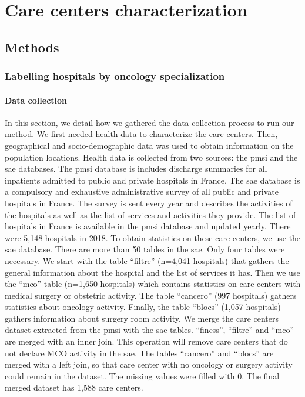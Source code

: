 \chapter{Care centers characterization}
\label{chapter:center-characterization}

\section{Methods}

\subsection{Labelling hospitals by oncology specialization}
\label{section:oncology-specialization-cluster}

\subsubsection{Data collection}

In this section, we detail how we gathered the data collection process to run
our method.  We first needed health data to characterize the care centers. Then,
geographical and socio-demographic data was used to obtain information on the
population locations. Health data is collected from two sources: the \ac{pmsi}
and the \ac{sae} databases. The \ac{pmsi} database is includes discharge
summaries for all inpatients admitted to public and private hospitals in France.
The \ac{sae} database is a compulsory and exhaustive administrative survey of
all public and private hospitals in France. The survey is sent every year and
describes the activities of the hospitals as well as the list of services and
activities they provide. The list of hospitals in France is available in the
\ac{pmsi} database and updated yearly. There were 5,148 hospitals in 2018. To
obtain statistics on these care centers, we use the \ac{sae} database. There are
more than 50 tables in the \ac{sae}. Only four tables were necessary. We start
with the table ``filtre'' (n=4,041 hospitals) that gathers the general
information about the hospital and the list of services it has. Then we use the
``mco'' table (n=1,650 hospitals) which contains statistics on care centers with
medical surgery or obstetric activity. The table ``cancero'' (997 hospitals)
gathers statistics about oncology activity. Finally, the table ``blocs'' (1,057
hospitals) gathers information about surgery room activity. We merge the care
centers dataset extracted from the \ac{pmsi} with the \ac{sae} tables.
``finess'', ``filtre'' and ``mco'' are merged with an inner join. This operation
will remove care centers that do not declare MCO activity in the \ac{sae}. The
tables ``cancero'' and ``blocs'' are merged with a left join, so that care
center with no oncology or surgery activity could remain in the dataset. The
missing values were filled with 0. The final merged dataset has 1,588 care
centers.

